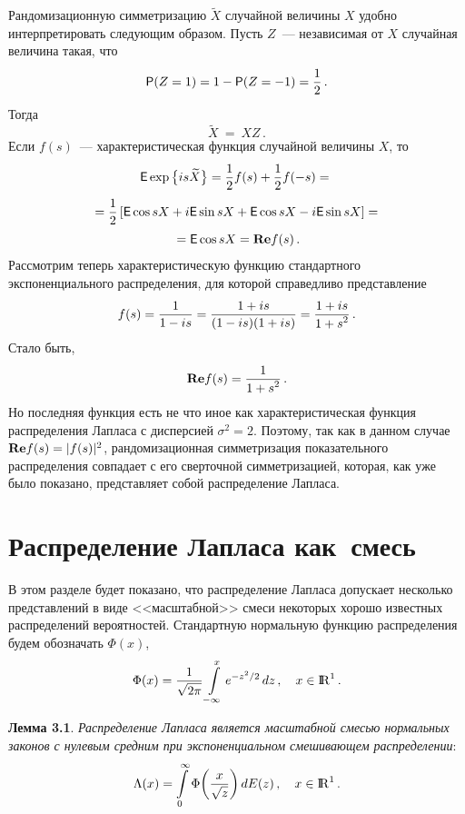\begin{multicols}{2}
Рандомизационную симметризацию $\widetilde X$ случайной величины
$X$ удобно интерпретировать сле\-ду\-ющим образом. Пусть $Z$~---
независимая от $X$ случайная величина такая, что 
$$
{\sf
P}(Z=1)=1-{\sf P}(Z=-1)=\displaystyle\frac{\displaystyle 1\mathstrut}{\displaystyle 2\mathstrut}\,.
$$ 
Тогда 
$$ 
\widetilde X\ =\ X
Z\,. 
$$ 
Если $f(s)$~--- характеристическая функция случайной величины
$X$, то
\begin{multline*}
{\sf E}\exp\big\{is\widetilde X\big\}=
\displaystyle\frac{\displaystyle 1\mathstrut}{\displaystyle 2\mathstrut}f(s)+ \displaystyle\frac{\displaystyle 1\mathstrut}{\displaystyle 2\mathstrut}f(-s)= {}\\
{}=\displaystyle\frac{\displaystyle 1\mathstrut}{\displaystyle 2\mathstrut}\left[
{\sf E}\cos sX+i{\sf E}\sin sX+{\sf
E}\cos sX- i{\sf E}\sin sX\right ]={}\\
{}=
{\sf E}\cos sX={\bf Re}f(s)\,.
\end{multline*}
Рассмотрим теперь характеристическую функцию стандартного
экспоненциального распределения, для которой справедливо
представление
$$
f(s)=\displaystyle\frac{\displaystyle 1\mathstrut}{\displaystyle 1-is\mathstrut}=\displaystyle\frac{\displaystyle 1+is\mathstrut}{\displaystyle (1-is)(1+is)\mathstrut}=\displaystyle\frac{\displaystyle 1+is\mathstrut}{\displaystyle 1+s^2\mathstrut}\,.
$$
Стало быть,
$$
{\bf Re}f(s)=\displaystyle\frac{\displaystyle 1\mathstrut}{\displaystyle 1+s^2\mathstrut}\,.
$$
Но последняя функция есть не что иное как характеристическая функция
распределения Лапласа с дисперсией $\sigma^2=2$. Поэтому, так как в
данном случае ${\bf Re}f(s)=|f(s)|^2$, рандомизационная
сим\-мет\-ри\-за\-ция показательного распределения совпадает с его
сверточной симметризацией, которая, как уже было показано,
представляет собой распределение Лапласа.

\section{Распределение Лапласа как~смесь}

В этом разделе будет показано, что распределение Лапласа допускает
несколько представлений в виде <<масштабной>> смеси некоторых
хорошо известных распределений вероятностей. Стандартную
нормальную функцию распределения будем обозначать $\Phi(x)$,
$$
\Phi(x)=\displaystyle\frac{\displaystyle 1\mathstrut}{\displaystyle \sqrt{2\pi}\mathstrut}\int\limits_{-\infty}^{x}e^{-z^2/2}\,dz\,,\quad
 x\in{\rm I\hspace{-0.7mm}\rm R}^1\,.
$$

\medskip

\noindent
\textbf{Лемма 3.1}. {\it Распределение Лапласа является масштабной
смесью нормальных законов с нулевым средним при экспоненциальном
смешивающем распределении}:
$$
\Lambda(x)=\int\limits_{0}^{\infty}\Phi\bigg(\displaystyle\frac{\displaystyle x\mathstrut}{\displaystyle \sqrt{z}\mathstrut}\bigg)\,dE(z)\,,\quad
 x\in{\rm I\hspace{-0.7mm}\rm R}^1\,.
$$

\smallskip


\end{multicols}
